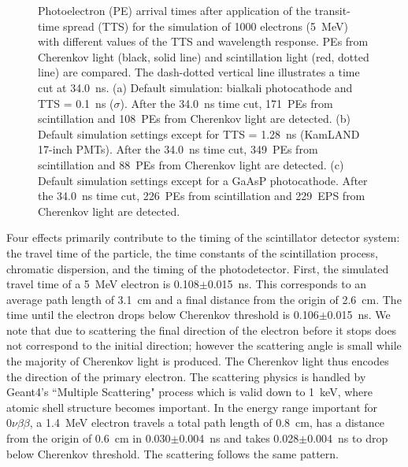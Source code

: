 \documentclass[cits]{JINST}
\begin{document}
\begin{figure}
\begin{center}
        \caption[]{Photoelectron (PE) arrival times after application
        of the transit-time spread (TTS) for the simulation
        of 1000 electrons (5~MeV) with different values of the TTS and
        wavelength response. PEs from
        Cherenkov light (black, solid line) and scintillation light
        (red, dotted line) are
        compared. The dash-dotted vertical line illustrates a time cut at
        34.0~ns. (a) Default simulation: bialkali photocathode and TTS =
        0.1~ns ($\sigma$). After the 34.0~ns time cut, 171~PEs
        from scintillation and 108~PEs from Cherenkov light are detected. (b)
        Default simulation settings except for TTS = 1.28~ns (KamLAND
        17-inch PMTs). After the 34.0~ns time cut, 349~PEs from
        scintillation and 88~PEs from Cherenkov light are detected. (c) Default
        simulation settings except for a GaAsP photocathode. After the
        34.0~ns time cut, 226~PEs from scintillation and 229~EPS
        from Cherenkov light are detected. \label{time_plots_comparison}}
        \end{center}
\end{figure}


Four effects primarily contribute to the timing of the scintillator detector
system: the travel time of the particle, the time constants of the scintillation process, chromatic dispersion, and the timing of the photodetector.  First, the simulated travel time of a 5~MeV electron is 0.108$\pm$0.015~ns. This corresponds to an average path length of 3.1~cm and a final distance from the origin of 2.6~cm. The time until the electron drops below Cherenkov threshold is 0.106$\pm$0.015~ns. We note that due to scattering the final direction of the electron before it stops does not correspond to the initial direction; however the scattering angle is small while the majority of Cherenkov light is produced. The Cherenkov light thus encodes the direction of the primary electron. The scattering physics is handled by Geant4's ``Multiple Scattering" process which is valid down to 1~keV, where atomic shell structure becomes important\cite{geant4scatt}. In the energy range important for $0\nu\beta\beta$, a 1.4~MeV electron travels a total path length of 0.8~cm, has a distance from the origin of 0.6~cm in 0.030$\pm$0.004~ns  and takes 0.028$\pm$0.004~ns to drop below Cherenkov threshold. The scattering follows the same pattern. 
\end{document}
